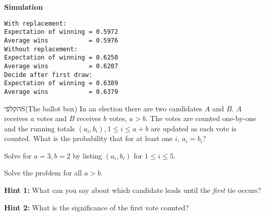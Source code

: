 \textbf{Simulation}
\begin{verbatim}
With replacement:
Expectation of winning = 0.5972
Average wins           = 0.5976
Without replacement:
Expectation of winning = 0.6250
Average wins           = 0.6207
Decide after first draw:
Expectation of winning = 0.6389
Average wins           = 0.6379
\end{verbatim}




\begin{prob}{הקלפי}{S}{(The ballot box)}
In an election there are two candidates $A$ and $B$.  $A$ receives $a$ votes and $B$ receives $b$ votes, $a>b$. The votes are counted one-by-one and the running totals $(a_i,b_i), 1\leq i \leq a+b$ are updated as each vote is counted. What is the probability that for at least one $i$, $a_i=b_i$?

 Solve for $a=3, b=2$ by listing $(a_i,b_i)$ for $1\leq i\leq 5$.

 Solve the problem for all $a>b$.

\textbf{Hint 1:} What can you say about which candidate leads until the \emph{first} tie occurs?

\textbf{Hint 2:} What is the significance of the first vote counted?
\end{prob}

\solution{}


